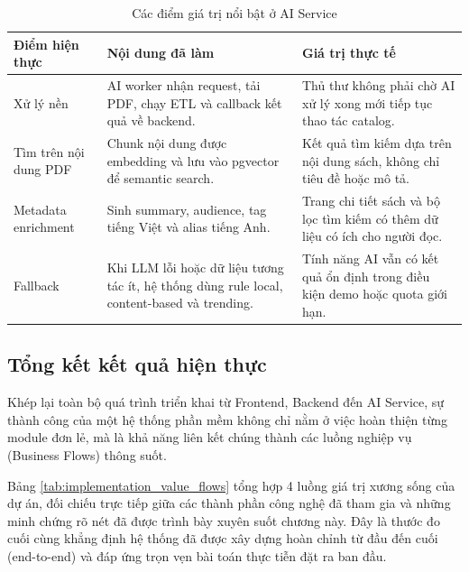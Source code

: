 \begin{table}[H]
\centering
\small
\begin{tabularx}{\textwidth}{|p{3.4cm}|p{5.6cm}|X|}
\hline
\textbf{Điểm hiện thực} & \textbf{Nội dung đã làm} & \textbf{Giá trị thực tế} \\
\hline
Xử lý nền &
AI worker nhận request, tải PDF, chạy ETL và callback kết quả về backend. &
Thủ thư không phải chờ AI xử lý xong mới tiếp tục thao tác catalog. \\
\hline
Tìm trên nội dung PDF &
Chunk nội dung được embedding và lưu vào pgvector để semantic search. &
Kết quả tìm kiếm dựa trên nội dung sách, không chỉ tiêu đề hoặc mô tả. \\
\hline
Metadata enrichment &
Sinh summary, audience, tag tiếng Việt và alias tiếng Anh. &
Trang chi tiết sách và bộ lọc tìm kiếm có thêm dữ liệu có ích cho người đọc. \\
\hline
Fallback &
Khi LLM lỗi hoặc dữ liệu tương tác ít, hệ thống dùng rule local, content-based và trending. &
Tính năng AI vẫn có kết quả ổn định trong điều kiện demo hoặc quota giới hạn. \\
\hline
\end{tabularx}
\caption{Các điểm giá trị nổi bật ở AI Service}
\label{tab:ai_value_highlights}
\end{table}

\subsection{Tổng kết kết quả hiện thực}

Khép lại toàn bộ quá trình triển khai từ Frontend, Backend đến AI Service, sự thành công của một hệ thống phần mềm không chỉ nằm ở việc hoàn thiện từng module đơn lẻ, mà là khả năng liên kết chúng thành các luồng nghiệp vụ (Business Flows) thông suốt.

Bảng \ref{tab:implementation_value_flows} tổng hợp 4 luồng giá trị xương sống của dự án, đối chiếu trực tiếp giữa các thành phần công nghệ đã tham gia và những minh chứng rõ nét đã được trình bày xuyên suốt chương này. Đây là thước đo cuối cùng khẳng định hệ thống đã được xây dựng hoàn chỉnh từ đầu đến cuối (end-to-end) và đáp ứng trọn vẹn bài toán thực tiễn đặt ra ban đầu.

